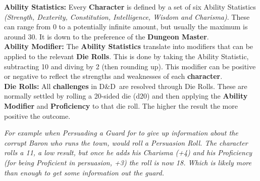 \documentclass[progress]{cmpreport}
\newcommand{\dnd}{D\&D}
\begin{document}
	\textbf{Ability Statistics:} Every \textbf{Character} is defined by a set of six Ability Statistics \textit{(Strength, Dexterity, Constitution, Intelligence, Wisdom and Charisma)}. These can range from 0 to a potentially infinite amount, but usually the maximum is around 30. It is down to the preference of the \textbf{Dungeon Master}. \\
	
	\textbf{Ability Modifier:} The \textbf{Ability Statistics} translate into modifiers that can be applied to the relevant \textbf{Die Rolls}. This is done by taking the Ability Statistic, subtracting 10 and diving by 2 (then rounding up). This modifier can be positive or negative to reflect the strengths and weaknesses of each \textbf{character}. \\
	
	\textbf{Die Rolls:} All \textbf{challenges} in \dnd \ are resolved through Die Rolls. These are normally settled by rolling a 20-sided die (d20) and then applying the \textbf{Ability Modifier} and \textbf{Proficiency} to that die roll. The higher the result the more positive the outcome. 
	
	\textit{For example when Persuading a Guard for to give up information about the corrupt Baron who runs the town, would roll a Persuasion Roll. The character rolls a 11, a low result, but once he adds his Charisma (+4) and his Proficiency (for being Proficient in persuasion, +3) the roll is now 18. Which is likely more than enough to get some information out the guard.}
	
\end{document}
